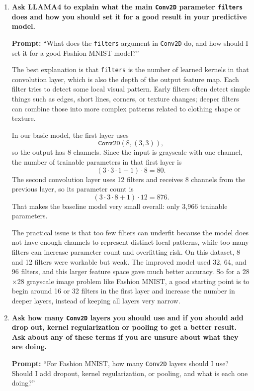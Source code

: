 \documentclass[10pt]{extarticle}
\begin{document}
\begin{enumerate}[label=\arabic*., leftmargin=2em]
\item \textbf{Ask LLAMA4 to explain what the main \texttt{Conv2D} parameter \texttt{filters} does and how you should set it for a good result in your predictive model.}

\noindent\textbf{Prompt:} ``What does the \texttt{filters} argument in \texttt{Conv2D} do, and how should I set it for a good Fashion MNIST model?''

The best explanation is that \texttt{filters} is the number of learned kernels in that convolution layer, which is also the depth of the output feature map. Each filter tries to detect some local visual pattern. Early filters often detect simple things such as edges, short lines, corners, or texture changes; deeper filters can combine those into more complex patterns related to clothing shape or texture.

In our basic model, the first layer uses
\[
\texttt{Conv2D}(8,(3,3)),
\]
so the output has 8 channels. Since the input is grayscale with one channel, the number of trainable parameters in that first layer is
\[
(3\cdot 3\cdot 1 + 1)\cdot 8 = 80.
\]
The second convolution layer uses 12 filters and receives 8 channels from the previous layer, so its parameter count is
\[
(3\cdot 3\cdot 8 + 1)\cdot 12 = 876.
\]
That makes the baseline model very small overall: only 3{,}966 trainable parameters.

The practical issue is that too few filters can underfit because the model does not have enough channels to represent distinct local patterns, while too many filters can increase parameter count and overfitting risk. On this dataset, 8 and 12 filters were workable but weak. The improved model used 32, 64, and 96 filters, and this larger feature space gave much better accuracy. So for a 28$\times$28 grayscale image problem like Fashion MNIST, a good starting point is to begin around 16 or 32 filters in the first layer and increase the number in deeper layers, instead of keeping all layers very narrow.

\item \textbf{Ask how many \texttt{Conv2D} layers you should use and if you should add drop out, kernel regularization or pooling to get a better result. Ask about any of these terms if you are unsure about what they are doing.}

\noindent\textbf{Prompt:} ``For Fashion MNIST, how many \texttt{Conv2D} layers should I use? Should I add dropout, kernel regularization, or pooling, and what is each one doing?''


\end{enumerate}
\end{document}
